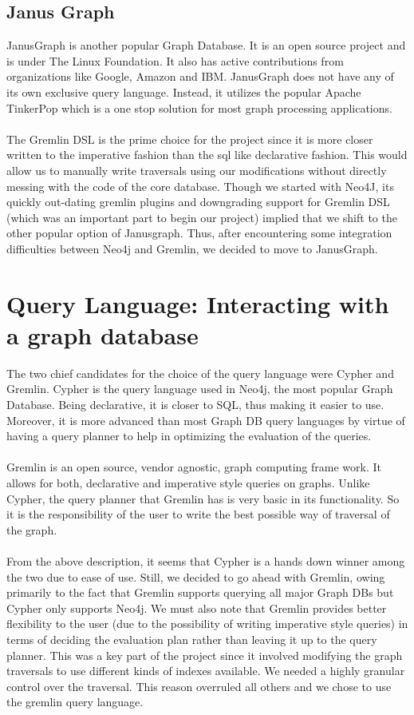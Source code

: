 \subsection{Janus Graph}
JanusGraph is another popular Graph Database. It is an open source project and is under The Linux Foundation. It also has active contributions from organizations like Google, Amazon and IBM. JanusGraph does not have any of its own exclusive query language. Instead, it utilizes the popular Apache TinkerPop which is a one stop solution for most graph processing applications.
\\\\
The Gremlin DSL is the prime choice for the project since it is more closer written to the imperative fashion than the sql like declarative fashion. This would allow us to manually write traversals using our modifications without directly messing with the code of the core database. Though we started with Neo4J, its quickly out-dating gremlin plugins and downgrading support for Gremlin DSL (which was an important part to begin our project) implied that we shift to the other popular option of Janusgraph. Thus, after encountering some integration difficulties between Neo4j and Gremlin, we decided to move to JanusGraph.\\

\section{Query Language: Interacting with a graph database}
The two chief candidates for the choice of the query language were Cypher and Gremlin. Cypher is the query language used in Neo4j, the most popular Graph Database. Being declarative, it is closer to SQL, thus making it easier to use. Moreover, it is more advanced than most Graph DB query languages by virtue of having a query planner to help in optimizing the evaluation of the queries.
\\\\
Gremlin is an open source, vendor agnostic, graph computing frame work. It allows for both, declarative and imperative style queries on graphs. Unlike Cypher, the query planner that Gremlin has is very basic in its functionality. So it is the responsibility of the user to write the best possible way of traversal of the graph.
\\\\
From the above description, it seems that Cypher is a hands down winner among the two due to ease of use. Still, we decided to go ahead with Gremlin, owing primarily to the fact that Gremlin supports querying all major Graph DBs but Cypher only supports Neo4j. We must also note that Gremlin provides better flexibility to the user (due to the possibility of writing imperative style queries) in terms of deciding the evaluation plan rather than leaving it up to the query planner. This was a key part of the project since it involved modifying the graph traversals to use different kinds of indexes available. We needed a highly granular control over the traversal. This reason overruled all others and we chose to use the gremlin query language\cite{tinkerpop1}.



